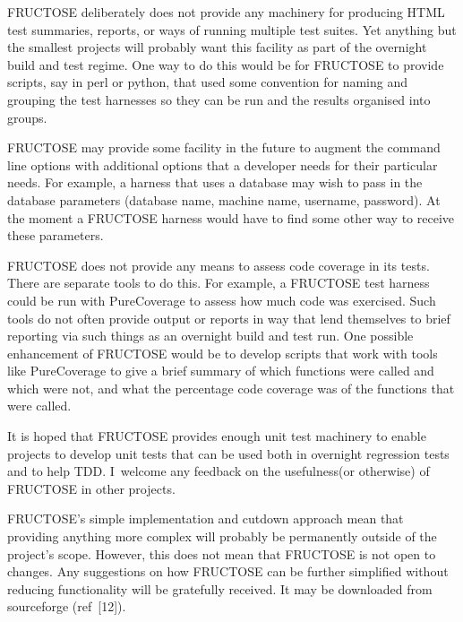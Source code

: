 \documentclass{book}
\begin{document}

FRUCTOSE deliberately does not provide any machinery for
producing HTML test summaries, reports, or ways of running
multiple test suites. Yet anything but the smallest projects
will probably want this facility as part of the overnight
build and test regime. One way to do this would be for
FRUCTOSE to provide scripts, say in perl or python,
that used some convention for naming and grouping
the test harnesses so they can be run and the results organised
into groups.

FRUCTOSE may provide some facility in the future to augment
the command line options with additional options that a
developer needs for their particular needs. For example,
a harness that uses a database may wish to pass in the database
parameters (database name, machine name, username, password).
At the moment a FRUCTOSE harness would have to find some other
way to receive these parameters.

FRUCTOSE does not provide any means to assess code coverage
in its tests. There are separate tools to do this.
For example, a FRUCTOSE test harness could be run with
PureCoverage to assess how much code was exercised.
Such tools do not often provide output or reports in way
that lend themselves to brief reporting via such things
as an overnight build and test run.
One possible enhancement of FRUCTOSE would be to develop
scripts that work with tools like PureCoverage to give
a brief summary of which functions were called and which were
not, and what the percentage code coverage was of the functions
that were called.


It is hoped that FRUCTOSE provides enough unit test machinery 
to enable projects to develop unit tests that can be used both 
in overnight regression tests and to help TDD.
I~welcome any feedback on the usefulness(or otherwise) of
FRUCTOSE in other projects.

FRUCTOSE's simple implementation and cutdown approach
mean that providing anything more complex will probably be permanently
outside of the project's scope.
However, this does not mean that FRUCTOSE is not open to changes.
Any suggestions on how FRUCTOSE can be further simplified
without reducing functionality will be gratefully received.
It may be downloaded from sourceforge (ref~[12]).

\end{document}
